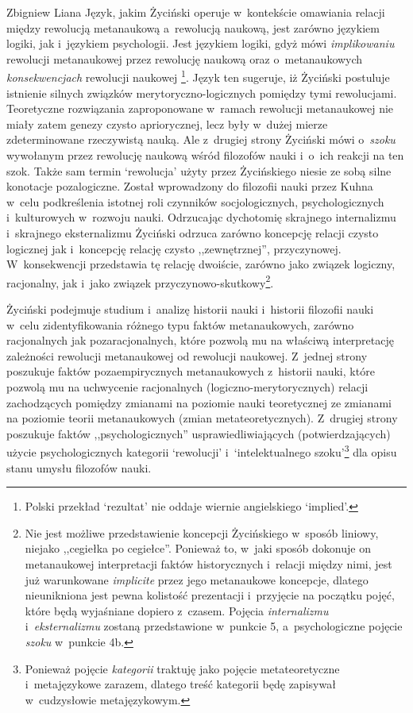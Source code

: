 \begin{artplenv}{Zbigniew Liana}
Język, jakim Życiński operuje w~kontekście omawiania relacji między rewolucją metanaukową a~rewolucją naukową, jest
zarówno językiem logiki, jak i~językiem psychologii. Jest językiem logiki, gdyż mówi \textit{implikowaniu} rewolucji
metanaukowej przez rewolucję naukową oraz o~metanaukowych \textit{konsekwencjach} rewolucji naukowej
\parencites[s.~8.13]{zycinski_structure_1988}[s.~15.24]{zycinski_struktura_2013}\footnote{Polski przekład `rezultat' nie oddaje
wiernie angielskiego `implied'.}. Język ten sugeruje, iż Życiński postuluje istnienie silnych związków
merytoryczno-logicznych pomiędzy tymi rewolucjami. Teoretyczne rozwiązania zaproponowane w~ramach rewolucji
metanaukowej nie miały zatem genezy czysto apriorycznej, lecz były w~dużej mierze  zdeterminowane rzeczywistą nauką.
Ale z~drugiej strony Życiński mówi o~\textit{szoku} wywołanym przez rewolucję naukową wśród filozofów nauki i~o~ich
reakcji na ten szok. Także sam termin `rewolucja' użyty przez Życińskiego niesie ze sobą silne konotacje pozalogiczne.
Został wprowadzony do filozofii nauki przez Kuhna w~celu podkreślenia istotnej roli czynników socjologicznych,
psychologicznych i~kulturowych w~rozwoju nauki. Odrzucając dychotomię skrajnego internalizmu i~skrajnego eksternalizmu
Życiński odrzuca zarówno koncepcję relacji czysto logicznej jak i~koncepcję relację czysto ,,zewnętrznej'',
przyczynowej. W~konsekwencji przedstawia tę relację dwoiście, zarówno jako związek logiczny, racjonalny, jak i~jako związek
przyczynowo-skutkowy\footnote{Nie jest możliwe przedstawienie koncepcji Życińskiego w~sposób liniowy, niejako ,,cegiełka
po cegiełce''. Ponieważ to, w~jaki sposób dokonuje on metanaukowej interpretacji faktów historycznych i~relacji między
nimi, jest już warunkowane \textit{implicite} przez jego metanaukowe koncepcje, dlatego nieunikniona jest pewna kolistość
prezentacji i~przyjęcie na początku pojęć, które będą wyjaśniane dopiero z~czasem. Pojęcia \textit{internalizmu} i~\textit{eksternalizmu}
zostaną przedstawione w~punkcie 5, a~psychologiczne pojęcie \textit{szoku} w~punkcie 4b.}.

Życiński podejmuje studium i~analizę historii nauki i~historii filozofii nauki w~celu zidentyfikowania różnego typu
faktów metanaukowych, zarówno racjonalnych jak pozaracjonalnych, które pozwolą mu na właściwą interpretację zależności
rewolucji metanaukowej od rewolucji naukowej. Z~jednej strony poszukuje faktów pozaempirycznych metanaukowych z~historii
nauki, które pozwolą mu na uchwycenie racjonalnych (logiczno-merytorycznych) relacji zachodzących pomiędzy
zmianami na poziomie nauki teoretycznej ze zmianami na poziomie teorii metanaukowych (zmian metateoretycznych). Z~drugiej
strony poszukuje faktów ,,psychologicznych'' usprawiedliwiających (potwierdzających) użycie psychologicznych
kategorii `rewolucji' i~`intelektualnego szoku'\footnote{Ponieważ pojęcie \textit{kategorii} traktuję jako pojęcie
metateoretyczne i~metajęzykowe zarazem, dlatego treść kategorii będę zapisywał w~cudzysłowie metajęzykowym.} dla opisu
stanu umysłu filozofów nauki.


\end{artplenv}
